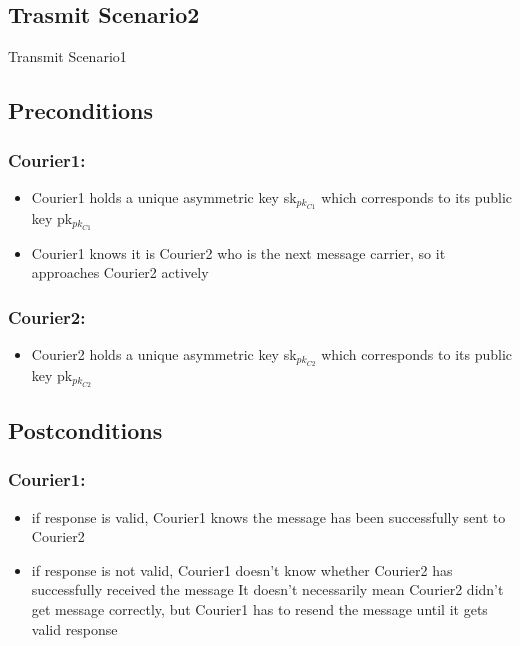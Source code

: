\documentclass{article}
\begin{document}
\subsection*{Trasmit Scenario2}
\begin{msc}{Transmit Scenario1}
\setlength{\instdist}{3\instdist}
\setlength{\envinstdist}{2\envinstdist}
\setlength{\levelheight}{1.5\levelheight}

\nextlevel
{}
\nextlevel[2]
\nextlevel
{}
\end{msc}


\subsection*{Preconditions}
\subsubsection*{Courier1:}
\begin{itemize}
\item Courier1 holds a unique asymmetric key sk$_{pk_{C1}}$ which corresponds to its public key pk$_{pk_{C1}}$
\item Courier1 knows it is Courier2 who is the next message carrier, so it approaches Courier2 actively
\end{itemize}

\subsubsection*{Courier2:}
\begin{itemize}
\item Courier2 holds a unique asymmetric key sk$_{pk_{C2}}$ which corresponds to its public key pk$_{pk_{C2}}$
\end{itemize}

\subsection*{Postconditions}
\subsubsection*{Courier1:}
\begin{itemize}
\item if response is valid, Courier1 knows the message has been successfully sent to Courier2
\item if response is not valid, Courier1 doesn't know whether Courier2 has successfully received the message
\newline 
It doesn't necessarily mean Courier2 didn't get message correctly, but Courier1 has to resend the message until it gets valid response
\end{itemize}
\end{document}
